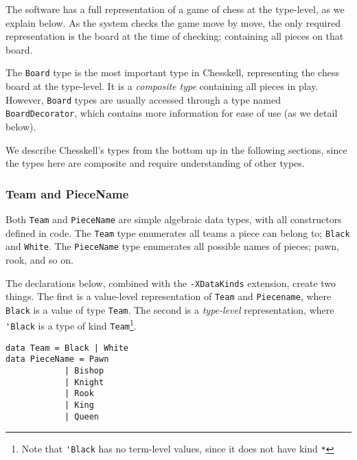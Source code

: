 \documentclass[12pt, a4paper, bibliography=totocnumbered]{scrartcl}
\begin{document}
The software has a full representation of a game of chess at the type-level, as we explain below. As the system checks the game move by move, the only required representation is the board at the time of checking; containing all pieces on that board.

The \lstinline{Board} type is the most important type in Chesskell, representing the chess board at the type-level. It is a \emph{composite type} containing all pieces in play. However, \lstinline{Board} types are usually accessed through a type named \lstinline{BoardDecorator}, which contains more information for ease of use (as we detail below).

We describe Chesskell's types from the bottom up in the following sections, since the types here are composite and require understanding of other types.

\subsubsection{Team and PieceName}

Both \lstinline{Team} and \lstinline{PieceName} are simple algebraic data types, with all constructors defined in code. The \lstinline{Team} type enumerates all teams a piece can belong to; \lstinline{Black} and \lstinline{White}. The \lstinline{PieceName} type enumerates all possible names of pieces; pawn, rook, and so on.

The declarations below, combined with the \lstinline{-XDataKinds} extension, create two things. The first is a value-level representation of \lstinline{Team} and \lstinline{Piecename}, where \lstinline{Black} is a value of type \lstinline{Team}. The second is a \emph{type-level} representation, where \lstinline{'Black} is a type of kind \lstinline{Team}\footnote{Note that \lstinline{'Black} has no term-level values, since it does not have kind \lstinline{*}}.


\begin{lstlisting}
data Team = Black | White
data PieceName = Pawn
            | Bishop
            | Knight
            | Rook
            | King
            | Queen
\end{lstlisting}
\end{document}
